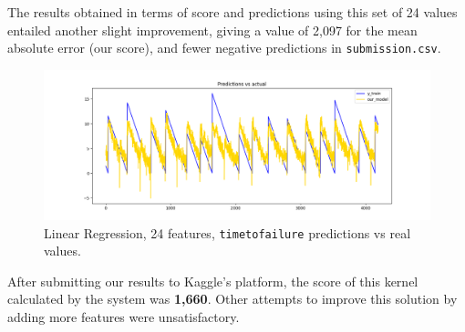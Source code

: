 The results obtained in terms of score and predictions using this set of 24 values entailed another slight improvement, giving a value of 2,097 for the mean absolute error (our score), and fewer negative predictions in \texttt{submission.csv}.

\begin{figure} [h]
	\centering
	\includegraphics[width=1\linewidth]{pictures/linear_regression_24f.png}
	\caption{Linear Regression, 24 features, \texttt{time\textunderscore to\textunderscore failure} predictions vs real values.}
	\label{fig:LR}
\end{figure}

After submitting our results to Kaggle's platform, the score of this kernel calculated by the system was \textbf{1,660}. Other attempts to improve this solution by adding more features were unsatisfactory.


